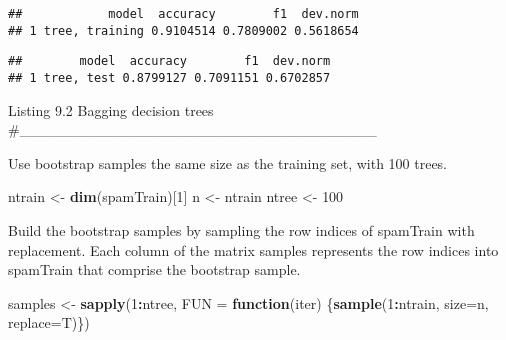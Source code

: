 \documentclass[]{article}
\newenvironment{Shaded}{\begin{snugshade}}{\end{snugshade}}
\newcommand{\ControlFlowTok}[1]{\textcolor[rgb]{0.13,0.29,0.53}{\textbf{#1}}}
\newcommand{\DataTypeTok}[1]{\textcolor[rgb]{0.13,0.29,0.53}{#1}}
\newcommand{\DecValTok}[1]{\textcolor[rgb]{0.00,0.00,0.81}{#1}}
\newcommand{\KeywordTok}[1]{\textcolor[rgb]{0.13,0.29,0.53}{\textbf{#1}}}
\newcommand{\NormalTok}[1]{#1}
\newcommand{\OperatorTok}[1]{\textcolor[rgb]{0.81,0.36,0.00}{\textbf{#1}}}
\newcommand{\StringTok}[1]{\textcolor[rgb]{0.31,0.60,0.02}{#1}}
\begin{document}
\begin{verbatim}
##            model  accuracy        f1  dev.norm
## 1 tree, training 0.9104514 0.7809002 0.5618654
\end{verbatim}

\begin{Shaded}
\end{Shaded}

\begin{verbatim}
##        model  accuracy        f1  dev.norm
## 1 tree, test 0.8799127 0.7091151 0.6702857
\end{verbatim}

Listing 9.2 Bagging decision trees
\#\_\_\_\_\_\_\_\_\_\_\_\_\_\_\_\_\_\_\_\_\_\_\_\_\_\_\_\_\_\_\_\_\_\_

Use bootstrap samples the same size as the training set, with 100 trees.

\begin{Shaded}
\begin{Highlighting}[]
\NormalTok{ntrain <-}\StringTok{ }\KeywordTok{dim}\NormalTok{(spamTrain)[}\DecValTok{1}\NormalTok{]}
\NormalTok{n <-}\StringTok{ }\NormalTok{ntrain}
\NormalTok{ntree <-}\StringTok{ }\DecValTok{100}
\end{Highlighting}
\end{Shaded}

Build the bootstrap samples by sampling the row indices of spamTrain
with replacement. Each column of the matrix samples represents the row
indices into spamTrain that comprise the bootstrap sample.

\begin{Shaded}
\begin{Highlighting}[]
\NormalTok{samples <-}\StringTok{ }\KeywordTok{sapply}\NormalTok{(}\DecValTok{1}\OperatorTok{:}\NormalTok{ntree,}
\DataTypeTok{FUN =} \ControlFlowTok{function}\NormalTok{(iter)}
\NormalTok{\{}\KeywordTok{sample}\NormalTok{(}\DecValTok{1}\OperatorTok{:}\NormalTok{ntrain, }\DataTypeTok{size=}\NormalTok{n, }\DataTypeTok{replace=}\NormalTok{T)\})}
\end{Highlighting}
\end{Shaded}
\end{document}

